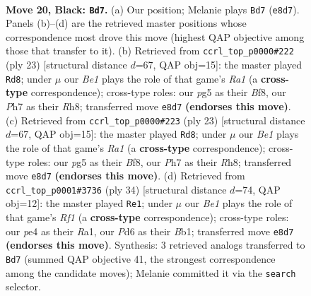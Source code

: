 \documentclass[11pt]{article}
\begin{document}
\clearpage

\begin{figure}[p]\centering
\begin{subfigure}{0.46\textwidth}\centering
\resizebox{\linewidth}{!}{%
\newchessgame
\chessboard[
  setfen={rn2b2r/1pq2kbp/p2pp1p1/4p1Pn/4P3/2N1BP2/PPPK2QP/1R2RB2 b - - 1 20},
  showmover=false,
  pgfstyle=straightmove, color=movearrow, markmove={e8-d7}
]}
\caption{}
\end{subfigure}\hfill
\begin{subfigure}{0.46\textwidth}\centering
\resizebox{\linewidth}{!}{%
\newchessgame
\chessboard[
  setfen={r3kb1r/1pqnnpp1/p1p1p2p/4Pb2/N1PP3N/8/P3BPPP/R1BQ1RK1 b kq - 0 12},
  showmover=false,
  pgfstyle=straightmove, color=movearrow, markmove={a8-d8}
]}
\caption{}
\end{subfigure}
\\[4pt]
\begin{subfigure}{0.46\textwidth}\centering
\resizebox{\linewidth}{!}{%
\newchessgame
\chessboard[
  setfen={r3kb1r/1pqnnpp1/p1p1p2p/4Pb2/N1PP3N/8/P3BPPP/R1BQ1RK1 b kq - 0 12},
  showmover=false,
  pgfstyle=straightmove, color=movearrow, markmove={a8-d8}
]}
\caption{}
\end{subfigure}\hfill
\begin{subfigure}{0.46\textwidth}\centering
\resizebox{\linewidth}{!}{%
\newchessgame
\chessboard[
  setfen={2r1k2r/1pqbbpp1/p3p2p/4P2P/1npP4/2B2N2/PP3PP1/RB1Q1RK1 w k - 0 18},
  showmover=false,
  pgfstyle=straightmove, color=movearrow, markmove={f1-e1}
]}
\caption{}
\end{subfigure}
\caption{\textbf{Move 20, Black: \texttt{Bd7}.} (a) Our position; Melanie plays \texttt{Bd7} (\texttt{e8d7}). Panels (b)--(d) are the retrieved master positions whose correspondence most drove this move (highest QAP objective among those that transfer to it). (b) Retrieved from \texttt{ccrl\_top\_p0000\#222} (ply 23) [structural distance $d$=67, QAP obj=15]: the master played \texttt{Rd8}; under $\mu$ our \emph{Be1} plays the role of that game's \emph{Ra1} (a \textbf{cross-type} correspondence); cross-type roles: our \emph{p}g5 as their \emph{B}f8, our \emph{P}h7 as their \emph{R}h8; transferred move \texttt{e8d7} \textbf{(endorses this move)}. (c) Retrieved from \texttt{ccrl\_top\_p0000\#223} (ply 23) [structural distance $d$=67, QAP obj=15]: the master played \texttt{Rd8}; under $\mu$ our \emph{Be1} plays the role of that game's \emph{Ra1} (a \textbf{cross-type} correspondence); cross-type roles: our \emph{p}g5 as their \emph{B}f8, our \emph{P}h7 as their \emph{R}h8; transferred move \texttt{e8d7} \textbf{(endorses this move)}. (d) Retrieved from \texttt{ccrl\_top\_p0001\#3736} (ply 34) [structural distance $d$=74, QAP obj=12]: the master played \texttt{Re1}; under $\mu$ our \emph{Be1} plays the role of that game's \emph{Rf1} (a \textbf{cross-type} correspondence); cross-type roles: our \emph{p}e4 as their \emph{R}a1, our \emph{P}d6 as their \emph{B}b1; transferred move \texttt{e8d7} \textbf{(endorses this move)}. Synthesis: 3 retrieved analogs transferred to \texttt{Bd7} (summed QAP objective 41, the strongest correspondence among the candidate moves); Melanie committed it via the \texttt{search} selector.}
\label{fig:thought-m39}
\end{figure}
\end{document}
